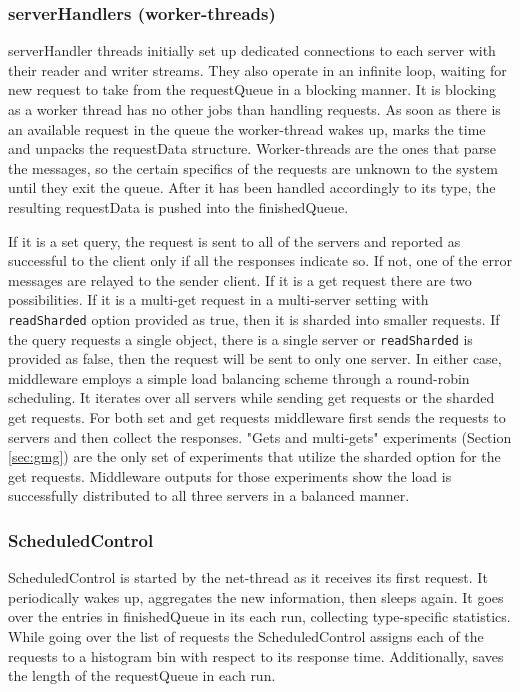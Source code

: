 \documentclass[11pt,a4paper]{article}
\begin{document}
\subsubsection{serverHandlers (worker-threads)} \label{sec:ov-workerthread}
serverHandler threads initially set up dedicated connections to each server with their reader and writer streams. They also operate in an infinite loop, waiting for new request to take from the requestQueue in a blocking manner. It is blocking as a worker thread has no other jobs than handling requests. As soon as there is an available request in the queue the worker-thread wakes up, marks the time and unpacks the requestData structure. Worker-threads are the ones that parse the messages, so the certain specifics of the requests are unknown to the system until they exit the queue. After it has been handled accordingly to its type, the resulting requestData is pushed into the finishedQueue.
\par
If it is a set query, the request is sent to all of the servers and reported as successful to the client only if all the responses indicate so. If not, one of the error messages are relayed to the sender client. If it is a get request there are two possibilities. If it is a multi-get request in a multi-server setting with \texttt{readSharded} option provided as true, then it is sharded into smaller requests. If the query requests a single object, there is a single server or \texttt{readSharded} is provided as false, then the request will be sent to only one server. In either case, middleware employs a simple load balancing scheme through a round-robin scheduling. It iterates over all servers while sending get requests or the sharded get requests. For both set and get requests middleware first sends the requests to servers and then collect the responses. "Gets and multi-gets" experiments (Section \ref{sec:gmg}) are the only set of experiments that utilize the sharded option for the get requests. Middleware outputs for those experiments show the load is successfully distributed to all three servers in a balanced manner.

\subsubsection{ScheduledControl} \label{sec:ov-scheduledcontrol}
ScheduledControl is started by the net-thread as it receives its first request. It periodically wakes up, aggregates the new information, then sleeps again. It goes over the entries in finishedQueue in its each run, collecting type-specific statistics. While going over the list of requests the ScheduledControl assigns each of the requests to a histogram bin with respect to its response time. Additionally, saves the length of the requestQueue in each run.
\end{document}
